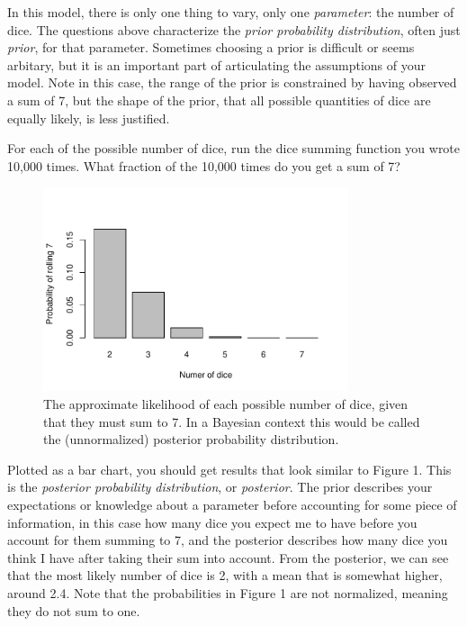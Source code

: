 \documentclass[a4paper,10pt]{article}
\begin{document}
In this model, there is only one thing to vary, only one \textit{parameter}: the number of dice. The questions above characterize the \textit{prior probability distribution}, often just \textit{prior}, for that parameter.  Sometimes choosing a prior is difficult or seems arbitary, but it is an important part of articulating the assumptions of your model.  Note in this case, the range of the prior is constrained by having observed a sum of 7, but the shape of the prior, that all possible quantities of dice are equally likely, is less justified.

For each of the possible number of dice, run the dice summing function you wrote 10,000 times.  What fraction of the 10,000 times do you get a sum of 7?

% 
% 

\begin{figure}[h]
 \centering
 \includegraphics[width=0.80\textwidth]{./simple_roll.pdf}
 \caption{The approximate likelihood of each possible number of dice, given that they must sum to 7.  In a Bayesian context this would be called the (unnormalized) posterior probability distribution.}
 \label{fig:dice_likelihood}
\end{figure}

Plotted as a bar chart, you should get results that look similar to Figure 1.  This is the \textit{posterior probability distribution}, or \textit{posterior}.  The prior describes your expectations or knowledge about a parameter before accounting for some piece of information, in this case how many dice you expect me to have before you account for them summing to 7, and the posterior describes how many dice you think I have after taking their sum into account.  From the posterior, we can see that the most likely number of dice is 2, with a mean that is somewhat higher, around 2.4.  Note that the probabilities in Figure 1 are not normalized, meaning they do not sum to one.
\end{document}
